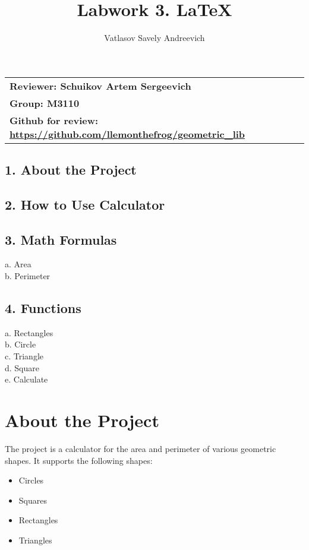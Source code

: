\documentclass{article}
\title{Labwork 3. LaTeX}
\author{Vatlasov Savely Andreevich}
\date{}
\begin{document}
\maketitle

\begin{center}
    \begin{tabular}{ll}
    \textbf{Reviewer: Schuikov Artem Sergeevich} & \\ 
    \textbf{Group: M3110} & \\ 
    \textbf{Github for review: \href{https://github.com/llemonthefrog/geometric_lib}{https://github.com/llemonthefrog/geometric_lib}}
    \end{tabular}
\end{center}

\newpage
\tableofcontents

\subsection*{1. About the Project}
\subsection*{2. How to Use Calculator}
\subsection*{3. Math Formulas}
    a. Area \\
    b. Perimeter \\
\subsection*{4. Functions}
    a. Rectangles \\
    b. Circle \\
    c. Triangle \\
    d. Square \\
    e. Calculate \\

\newpage


\section*{About the Project}

The project is a calculator for the area and perimeter of various geometric shapes. It supports the following shapes:
\begin{itemize}
\item Circles
\item Squares
\item Rectangles
\item Triangles
\end{itemize}
\end{document}
